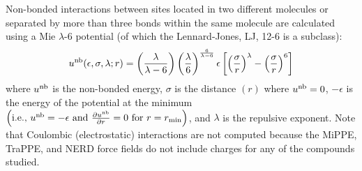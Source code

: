 \documentclass[journal=jced,manuscript=article]{achemso}
\begin{document}
    
    Non-bonded interactions between sites located in two different molecules or separated by more than three bonds within the same molecule are calculated using a Mie $\lambda$-6 potential (of which the Lennard-Jones, LJ, 12-6 is a subclass):
    \begin{equation} \label{eq:Mie}
    u^{\rm nb}(\epsilon,\sigma,\lambda;r) = \left(\frac{\lambda}{\lambda - 6}\right)\left(\frac{\lambda}{6}\right)^{\frac{6}{\lambda - 6}} \epsilon \left[\left(\frac{\sigma}{r}\right)^{\lambda} - \left(\frac{\sigma}{r}\right)^6\right]
    \end{equation} 
    where $u^{\rm nb}$ is the non-bonded energy, $\sigma$ is the distance $(r)$ where $u^{\rm nb} = 0$, $-\epsilon$ is the energy of the potential at the minimum $\left(\text{i.e., }u^{\rm nb} = -\epsilon \text{ and } \frac{\partial u^{\rm nb}}{\partial r} = 0 \text{ for } r=r_{\rm min} \right)$, and $\lambda$ is the repulsive exponent. Note that Coulombic (electrostatic) interactions are not computed because the MiPPE, TraPPE, and NERD force fields do not include charges for any of the compounds studied.
    
\end{document}

